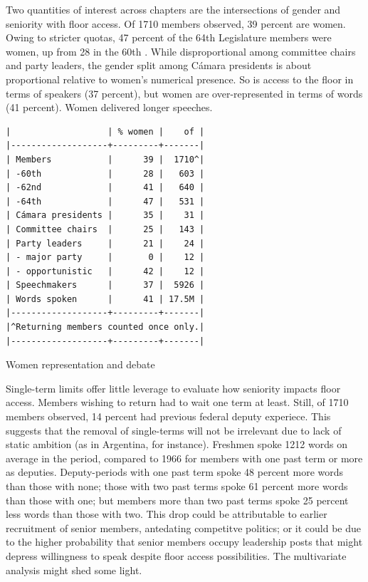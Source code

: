 \documentclass[letter,12pt]{article}
\begin{document}
  Two quantities of interest across chapters are the intersections of gender and seniority with floor access. Of 1710 members observed, 39 percent are women. Owing to stricter quotas, 47 percent of the 64th Legislature members were women, up from 28 in the 60th \citep{piscopo.2016}. While disproportional among committee chairs and party leaders, the gender split among Cámara presidents is about proportional relative to women's numerical presence. So is access to the floor in terms of speakers (37 percent), but women are over-represented in terms of words (41 percent). Women delivered longer speeches.

\begin{table}
  \begin{scriptsize}
    \begin{verbatim}
|                   | % women |    of |
|-------------------+---------+-------|
| Members           |      39 |  1710^|
| -60th             |      28 |   603 |
| -62nd             |      41 |   640 |
| -64th             |      47 |   531 |
| Cámara presidents |      35 |    31 |
| Committee chairs  |      25 |   143 |
| Party leaders     |      21 |    24 |
| - major party     |       0 |    12 |
| - opportunistic   |      42 |    12 |
| Speechmakers      |      37 |  5926 |
| Words spoken      |      41 | 17.5M |
|-------------------+---------+-------|
|^Returning members counted once only.|
|-------------------+---------+-------|
    \end{verbatim}
  \end{scriptsize}
\caption{Women representation and debate}\label{T:women}
\end{table}


Single-term limits offer little leverage to evaluate how seniority impacts floor access. Members wishing to return had to wait one term at least. Still, of 1710 members observed, 14 percent had previous federal deputy experiece. This suggests that the removal of single-terms will not be irrelevant due to lack of static ambition (as in Argentina, for instance). Freshmen spoke 1212 words on average in the period, compared to 1966 for members with one past term or more as deputies. Deputy-periods with one past term spoke 48 percent more words than those with none; those with two past terms spoke 61 percent more words than those with one; but members more than two past terms spoke 25 percent less words than those with two. This drop could be attributable to earlier recruitment of senior members, antedating competitve politics; or it could be due to the higher probability that senior members occupy leadership posts that might depress willingness to speak despite floor access possibilities. The multivariate analysis might shed some light.  
\end{document}
